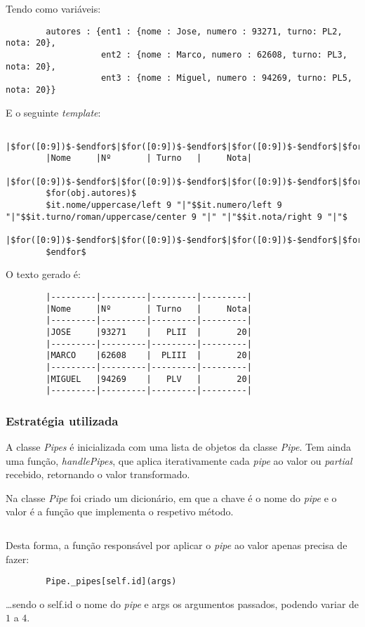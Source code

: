 \documentclass[../relatorio.tex]{subfiles}
\begin{document}
    Tendo como variáveis:
    \begin{verbatim}
        autores : {ent1 : {nome : Jose, numero : 93271, turno: PL2, nota: 20}, 
                   ent2 : {nome : Marco, numero : 62608, turno: PL3, nota: 20},
                   ent3 : {nome : Miguel, numero : 94269, turno: PL5, nota: 20}}
    \end{verbatim}
    E o seguinte \textit{template}:
    \begin{verbatim}
        |$for([0:9])$-$endfor$|$for([0:9])$-$endfor$|$for([0:9])$-$endfor$|$for([0:9])$-$endfor$|
        |Nome     |Nº       | Turno   |     Nota|
        |$for([0:9])$-$endfor$|$for([0:9])$-$endfor$|$for([0:9])$-$endfor$|$for([0:9])$-$endfor$|
        $for(obj.autores)$
        $it.nome/uppercase/left 9 "|"$$it.numero/left 9 "|"$$it.turno/roman/uppercase/center 9 "|" "|"$$it.nota/right 9 "|"$
        |$for([0:9])$-$endfor$|$for([0:9])$-$endfor$|$for([0:9])$-$endfor$|$for([0:9])$-$endfor$|
        $endfor$
    \end{verbatim}
    O texto gerado é:
    \begin{verbatim}
        |---------|---------|---------|---------|
        |Nome     |Nº       | Turno   |     Nota|
        |---------|---------|---------|---------|
        |JOSE     |93271    |   PLII  |       20|
        |---------|---------|---------|---------|
        |MARCO    |62608    |  PLIII  |       20|
        |---------|---------|---------|---------|
        |MIGUEL   |94269    |   PLV   |       20|
        |---------|---------|---------|---------|
    \end{verbatim}

    \subsubsection{Estratégia utilizada}

    A classe \textit{Pipes} é inicializada com uma lista de objetos da classe 
    \textit{Pipe}. Tem ainda uma função, \textit{handlePipes}, que aplica iterativamente
    cada \textit{pipe} ao valor ou \textit{partial} recebido, retornando o valor transformado.

    Na classe \textit{Pipe} foi criado um dicionário, em que a chave é o nome do \textit{pipe} 
    e o valor é a função que implementa o respetivo método. 
    
    \inputminted[firstline=215, lastline=232]{py}{../modules/Pipe.py}
    
    Desta forma, a função responsável por aplicar o \textit{pipe} ao valor apenas precisa
    de fazer:
    \begin{verbatim}
        Pipe._pipes[self.id](args)
    \end{verbatim}
    \dots sendo o self.id o nome do \textit{pipe} e args os argumentos passados, podendo variar de
    $1$ a $4$. 
\end{document}

